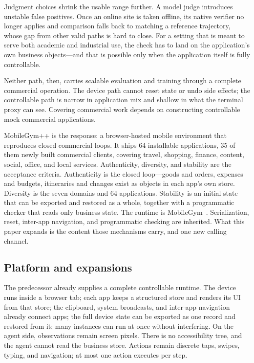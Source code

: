 Judgment choices shrink the usable range further. A model judge introduces unstable false positives. Once an online site is taken offline, its native verifier no longer applies and comparison falls back to matching a reference trajectory, whose gap from other valid paths is hard to close. For a setting that is meant to serve both academic and industrial use, the check has to land on the application's own business objects---and that is possible only when the application itself is fully controllable.

Neither path, then, carries scalable evaluation and training through a complete commercial operation. The device path cannot reset state or undo side effects; the controllable path is narrow in application mix and shallow in what the terminal proxy can see. Covering commercial work depends on constructing controllable mock commercial applications.

MobileGym++ is the response: a browser-hosted mobile environment that reproduces closed commercial loops. It ships 64 installable applications, 35 of them newly built commercial clients, covering travel, shopping, finance, content, social, office, and local services. Authenticity, diversity, and stability are the acceptance criteria. Authenticity is the closed loop---goods and orders, expenses and budgets, itineraries and changes exist as objects in each app's own store. Diversity is the seven domains and 64 applications. Stability is an initial state that can be exported and restored as a whole, together with a programmatic checker that reads only business state. The runtime is MobileGym~\citep{wu2026mobilegym}. Serialization, reset, inter-app navigation, and programmatic checking are inherited. What this paper expands is the content those mechanisms carry, and one new calling channel.

\subsection{Platform and expansions}
\label{sec:mgpp-inherit}

The predecessor already supplies a complete controllable runtime. The device runs inside a browser tab; each app keeps a structured store and renders its UI from that store; the clipboard, system broadcasts, and inter-app navigation already connect apps; the full device state can be exported as one record and restored from it; many instances can run at once without interfering. On the agent side, observations remain screen pixels. There is no accessibility tree, and the agent cannot read the business store. Actions remain discrete taps, swipes, typing, and navigation; at most one action executes per step.

